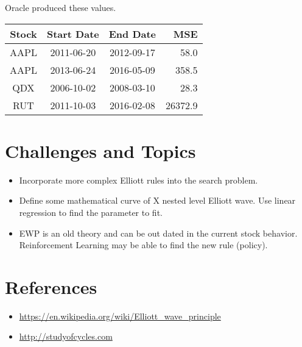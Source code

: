 \documentclass[12pt]{article}
\begin{document}
Oracle produced these values.

\begin{tabular}{cccr}
  Stock & Start Date & End Date & MSE \\
  \hline
  AAPL & 2011-06-20 & 2012-09-17 & 58.0 \\ 
  AAPL & 2013-06-24 & 2016-05-09 & 358.5 \\
  QDX  & 2006-10-02 & 2008-03-10 & 28.3 \\
RUT  & 2011-10-03 & 2016-02-08 & 26372.9 \\
\end{tabular}

\section{Challenges and Topics}

\begin{itemize}
\item Incorporate more complex Elliott rules into the search problem.
\item Define some mathematical curve of X nested level Elliott
  wave. Use linear regression to find the parameter to fit.
\item EWP is an old theory and can be out dated in the current stock
  behavior. Reinforcement Learning may be able to find the new rule
  (policy).
\end{itemize}

\section*{References}

\begin{itemize}
\item \url{https://en.wikipedia.org/wiki/Elliott_wave_principle}
\item \url{http://studyofcycles.com}
\end{itemize}
     
\end{document}
